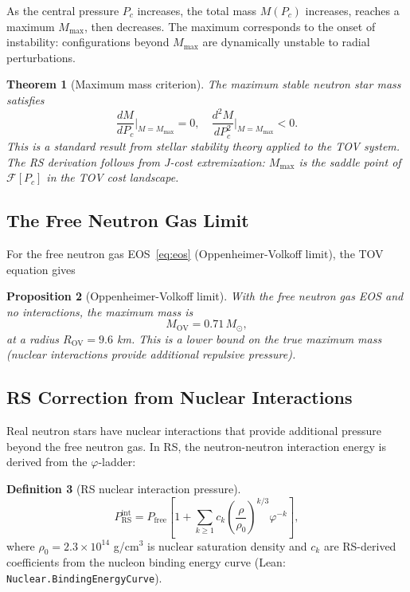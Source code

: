 \documentclass[12pt,a4paper]{article}
\newtheorem{theorem}{Theorem}[section]
\newtheorem{proposition}[theorem]{Proposition}
\theoremstyle{definition}
\newtheorem{definition}[theorem]{Definition}
\theoremstyle{remark}
\begin{document}
As the central pressure $P_c$ increases, the total mass $M(P_c)$
increases, reaches a maximum $M_\mathrm{max}$, then decreases.
The maximum corresponds to the onset of instability: configurations
beyond $M_\mathrm{max}$ are dynamically unstable to radial perturbations.

\begin{theorem}[Maximum mass criterion]\label{thm:maxmass}
The maximum stable neutron star mass satisfies
\begin{equation}
  \frac{dM}{dP_c}\bigg|_{M = M_\mathrm{max}} = 0,
  \quad
  \frac{d^2 M}{dP_c^2}\bigg|_{M = M_\mathrm{max}} < 0.
\end{equation}
This is a standard result from stellar stability theory applied to
the TOV system.  The RS derivation follows from J-cost extremization:
$M_\mathrm{max}$ is the saddle point of $\mathcal{F}[P_c]$ in the
TOV cost landscape.
\end{theorem}

\subsection{The Free Neutron Gas Limit}

For the free neutron gas EOS~\eqref{eq:eos} (Oppenheimer-Volkoff
limit), the TOV equation gives

\begin{proposition}[Oppenheimer-Volkoff limit]\label{prop:ov}
With the free neutron gas EOS and no interactions, the maximum mass is
\begin{equation}
  M_\mathrm{OV} = 0.71\,M_\odot,
  \label{eq:mov}
\end{equation}
at a radius $R_\mathrm{OV} = 9.6$ km.  This is a lower bound on the
true maximum mass (nuclear interactions provide additional repulsive
pressure).
\end{proposition}

\subsection{RS Correction from Nuclear Interactions}

Real neutron stars have nuclear interactions that provide additional
pressure beyond the free neutron gas.  In RS, the neutron-neutron
interaction energy is derived from the $\varphi$-ladder:

\begin{definition}[RS nuclear interaction pressure]
\begin{equation}
  P_\mathrm{RS}^\mathrm{int} = P_\mathrm{free}
  \left[1 + \sum_{k \geq 1} c_k \left(\frac{\rho}{\rho_0}\right)^{k/3}
  \varphi^{-k}\right],
  \label{eq:prs}
\end{equation}
where $\rho_0 = 2.3\times10^{14}$ g/cm$^3$ is nuclear saturation density
and $c_k$ are RS-derived coefficients from the nucleon binding energy
curve (Lean: \texttt{Nuclear.BindingEnergyCurve}).
\end{definition}
\end{document}
